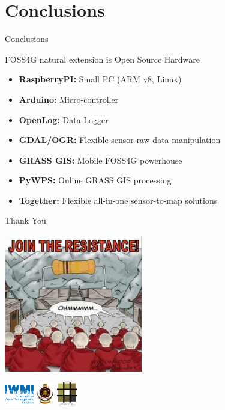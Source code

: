 \documentclass[xcolor=dvipsnames,beamer]{beamer} %
\begin{document}
\section{Conclusions}
\begin{frame}[fragile]{Conclusions}

\begin{block}{FOSS4G natural extension is Open Source Hardware}
\begin{itemize}
 \item {\bf RaspberryPI:} Small PC (ARM v8, Linux) 
 \item {\bf Arduino:} Micro-controller
 \item {\bf OpenLog:} Data Logger
 \item {\bf GDAL/OGR:} Flexible sensor raw data manipulation
 \item {\bf GRASS GIS:} Mobile FOSS4G powerhouse
 \item {\bf PyWPS:} Online GRASS GIS processing 
 \item {\bf Together:} Flexible all-in-one sensor-to-map solutions
\end{itemize}
\end{block}

\end{frame}

\begin{frame}[fragile]{Thank You}

\begin{center}
 \includegraphics[height=6cm]{ohm}
\end{center}

\begin{flushright}
 \includegraphics[height=0.9cm]{iwmi}
 \hspace{5mm}
 \includegraphics[height=1cm]{uoMoratuwa}
 \hspace{5mm}
 \includegraphics[height=1cm]{uoMoratuwa_foa}
\end{flushright}

\end{frame}
\end{document}
